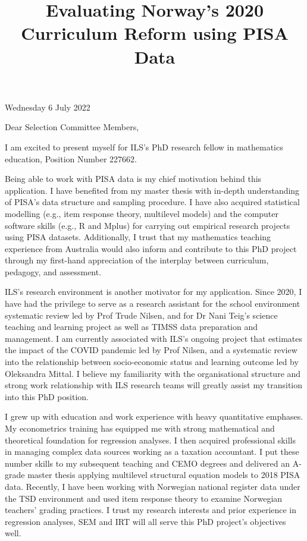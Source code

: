 \documentclass[
    a4paper,                %
    11pt,                   %
    stu,                    %
    donotrepeattitle,       %
    floatsintext,           %
    biblatex,               %
    colorlinks=true,        %
    linkcolor=red,          %
    anchorcolor=black,      %
    citecolor=blue,         %
    urlcolor=blue,          %
    bookmarks=true,         %
    bookmarksopen=false,    %
    bookmarksnumbered=true, %
    dvipsnames              %
]{apa7}
\title{Evaluating Norway's 2020 Curriculum Reform using PISA Data}
\begin{document}
\setcounter{page}{0}
\maketitle

\begin{flushright}
    Wednesday 6 July 2022
\end{flushright}

\noindent Dear Selection Committee Members,

\bigskip

I am excited to present myself for ILS's PhD research fellow in mathematics education, Position Number 227662.

Being able to work with PISA data is my chief motivation behind this application. I have benefited from my master thesis with in-depth understanding of PISA's data structure and sampling procedure. I have also acquired statistical modelling (e.g., item response theory, multilevel models) and the computer software skills (e.g., R and Mplus) for carrying out empirical research projects using PISA datasets. Additionally, I trust that my mathematics teaching experience from Australia would also inform and contribute to this PhD project through my first-hand appreciation of the interplay between curriculum, pedagogy, and assessment.

ILS's research environment is another motivator for my application. Since 2020, I have had the privilege to serve as a research assistant for the school environment systematic review led by Prof Trude Nilsen, and for Dr Nani Teig's science teaching and learning project as well as TIMSS data preparation and management. I am currently associated with ILS's ongoing project that estimates the impact of the COVID pandemic led by Prof Nilsen, and a systematic review into the relationship between socio-economic status and learning outcome led by Oleksandra Mittal. I believe my familiarity with the organisational structure and strong work relationship with ILS research teams will greatly assist my transition into this PhD position.

I grew up with education and work experience with heavy quantitative emphases. My econometrics training has equipped me with strong mathematical and theoretical foundation for regression analyses. I then acquired professional skills in managing complex data sources working as a taxation accountant. I put these number skills to my subsequent teaching and CEMO degrees and delivered an A-grade master thesis applying multilevel structural equation models to 2018 PISA data. Recently, I have been working with Norwegian national register data under the TSD environment and used item response theory to examine Norwegian teachers' grading practices. I trust my research interests and prior experience in regression analyses, SEM and IRT will all serve this PhD project's objectives well.
\end{document}
